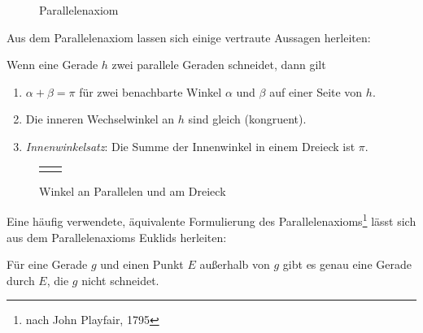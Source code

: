\begin{figure}[h]
    
    \caption{Parallelenaxiom}
\end{figure}

Aus dem Parallelenaxiom lassen sich einige vertraute Aussagen herleiten:

\begin{thm}
    Wenn eine Gerade $h$ zwei parallele Geraden %
    schneidet, dann gilt
    \begin{enumerate}
        \item $\alpha + \beta = \pi$ für zwei benachbarte Winkel $\alpha$ und $\beta$  auf einer
        Seite von $h$.
        \item Die inneren Wechselwinkel an $h$ sind gleich (kongruent).
        \item {\em Innenwinkelsatz}: Die Summe der Innenwinkel in einem Dreieck ist $\pi$.
    \end{enumerate}
\end{thm}

\begin{figure}[h]
    \begin{tabular}{cc}
        
        &
        
    \end{tabular}
    \caption{Winkel an Parallelen und am Dreieck}
\end{figure}



Eine häufig verwendete, äquivalente Formulierung des Parallelenaxioms\footnote{nach John Playfair,
1795} lässt sich aus dem Parallelenaxioms Euklids herleiten:

\begin{thm}
    Für eine Gerade $g$ und einen Punkt $E$ außerhalb von $g$ gibt es genau eine Gerade durch $E$,
    die $g$ nicht schneidet.
\end{thm}

